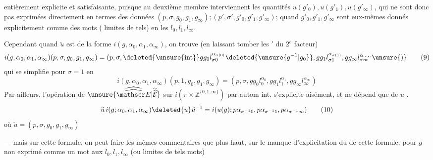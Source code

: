 entièrement explicite et satisfaisante, puisque au deuxième membre interviennent les quantités $u(g'_0),u(g'_1),u(g'_\infty)$, qui ne sont donc pas exprimées directement en termes des  données $(p,\sigma,g_0,g_1,g_\infty);(p',\sigma',g'_0,g'_1,g'_\infty)$;   quand $g'_0,g'_1,g'_\infty$ sont eux-mêmes donnés explicitement comme des mots ( limites de tels) en les $l_0,l_1,l_\infty$.

Cependant quand $\widetilde u$ est de la forme $i(g,\alpha_0,\alpha_1,\alpha_\infty)$, on trouve (en laissant tomber les $'$ du $2^e$ facteur)
\[
i(g,\alpha_0,\alpha_1,\alpha_\infty)(p,\sigma,g_0,g_1,g_\infty)=(p,\sigma,\deleted{\unsure{\operatorname{int}}}g g_0l_{\sigma0}^{\alpha_{\sigma(0)}}\deleted{\unsure{g^{-1}|g_0}},g g_1l_{\sigma1}^{\alpha_{\sigma(1)}},g g_\infty l_{\sigma\infty}^{\alpha_{\sigma\infty}}\unsure{)}\tag*{(9)}
\]
qui se simplifie pour $\sigma=1$ en
\[
i(g,\alpha_0,\alpha_1,\alpha_\infty)(p,1,g_0,g_1,g_\infty)=(p,\sigma,g g_0l_0^{\alpha_0},g g_1l_1^{\alpha_1},g g_\infty l_\infty^{\alpha_\infty})\tag*{(9')}
\]
Par ailleurs, l'opération de $\unsure{\widehat{\widehat{\mathscr E}}|\widehat{\widehat{\mathcal E}}}$ sur $i(\pi\times\mathbb Z^{\{0,1,\infty\}})$ par autom int. s'explicite aisément, et ne dépend que de $u$ .
\[
\widetilde u\,i(g;\alpha_0,\alpha_1,\alpha_\infty)\deleted{u}\widetilde u^{-1}=i(u(g);p\alpha_{\sigma^{-1}0},p\alpha_{\sigma^{-1}1},p\alpha_{\sigma^{-1}\infty})\tag*{(10)}
\]
où $\widetilde u=(p,\sigma,g_0,g_1,g_\infty)$

--- mais sur cette formule, on peut faire les mêmes commentaires que plus haut, sur le manque d'explicitation du  de cette formule, pour $g$ non exprimé comme un mot  aux $l_0,l_1,l_\infty$ (ou limites de tels mots)
